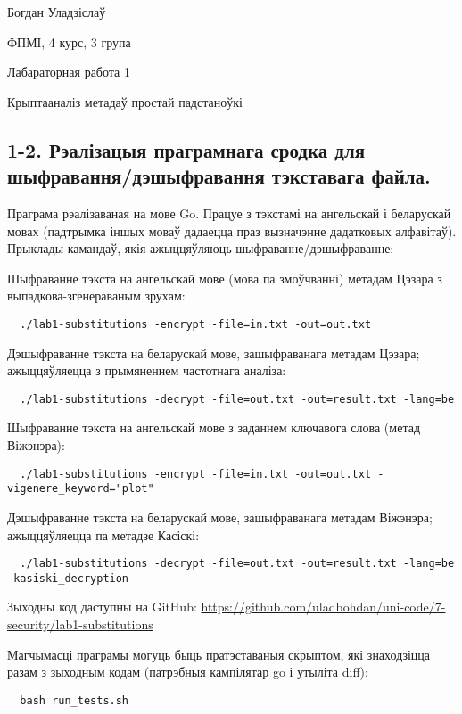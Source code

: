 \documentclass{article}
\begin{document}
{\large

Богдан Уладзіслаў

ФПМІ, 4 курс, 3 група

\vspace{5mm}

Лабараторная работа 1

Крыптааналіз метадаў простай падстаноўкі

}

\vspace{5mm}

\subsection*{1-2. Рэалізацыя праграмнага сродка для шыфравання/дэшыфравання тэкставага файла.}

Праграма рэалізаваная на мове Go.
Працуе з тэкстамі на ангельскай і беларускай мовах (падтрымка іншых моваў
дадаецца праз вызначэнне дадатковых алфавітаў).
Прыклады камандаў, якія ажыццяўляюць шыфраванне/дэшыфраванне:

Шыфраванне тэкста на ангельскай мове (мова па змоўчванні) метадам Цэзара з
выпадкова-згенераваным зрухам:
\begin{verbatim}
  ./lab1-substitutions -encrypt -file=in.txt -out=out.txt
\end{verbatim}

Дэшыфраванне тэкста на беларускай мове, зашыфраванага метадам Цэзара;
ажыццяўляецца з прымяненнем частотнага аналіза:
\begin{verbatim}
  ./lab1-substitutions -decrypt -file=out.txt -out=result.txt -lang=be
\end{verbatim}

Шыфраванне тэкста на ангельскай мове з заданнем ключавога слова (метад Віжэнэра):
\begin{verbatim}
  ./lab1-substitutions -encrypt -file=in.txt -out=out.txt -vigenere_keyword="plot"
\end{verbatim}

Дэшыфраванне тэкста на беларускай мове, зашыфраванага метадам Віжэнэра;
ажыццяўляецца па метадзе Касіскі:
\begin{verbatim}
  ./lab1-substitutions -decrypt -file=out.txt -out=result.txt -lang=be -kasiski_decryption
\end{verbatim}

Зыходны код даступны на GitHub: \url{https://github.com/uladbohdan/uni-code/7-security/lab1-substitutions}

Магчымасці праграмы могуць быць пратэставаныя скрыптом, які знаходзіцца разам з
зыходным кодам (патрэбныя кампілятар go і утыліта diff):
\begin{verbatim}
  bash run_tests.sh
\end{verbatim}
\end{document}
